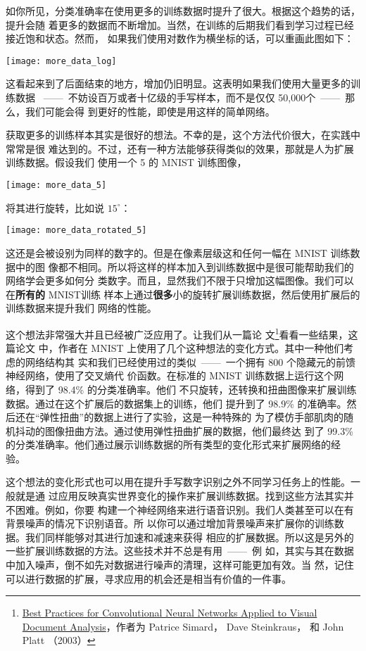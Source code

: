 如你所见，分类准确率在使用更多的训练数据时提升了很大。根据这个趋势的话，提升会随
着更多的数据而不断增加。当然，在训练的后期我们看到学习过程已经接近饱和状态。然而，
如果我们使用对数作为横坐标的话，可以重画此图如下：
\begin{center}
\texttt{[image: more\_data\_log]}
\end{center}

这看起来到了后面结束的地方，增加仍旧明显。这表明如果我们使用大量更多的训练数据
~——~不妨设百万或者十亿级的手写样本，而不是仅仅 50,000个~——~那么，我们可能会得
到更好的性能，即使是用这样的简单网络。

获取更多的训练样本其实是很好的想法。不幸的是，这个方法代价很大，在实践中常常是很
难达到的。不过，还有一种方法能够获得类似的效果，那就是人为扩展训练数据。假设我们
使用一个 5 的 MNIST 训练图像，
\begin{center}
  \texttt{[image: more\_data\_5]}
\end{center}
将其进行旋转，比如说 $15^{\circ}$：
\begin{center}
  \texttt{[image: more\_data\_rotated\_5]}
\end{center}

这还是会被设别为同样的数字的。但是在像素层级这和任何一幅在 MNIST 训练数据中的图
像都不相同。所以将这样的样本加入到训练数据中是很可能帮助我们的网络学会更多如何分
类数字。而且，显然我们不限于只增加这幅图像。我们可以在\textbf{所有的} MNIST训练
样本上通过\textbf{很多}小的旋转扩展训练数据，然后使用扩展后的训练数据来提升我们
网络的性能。

这个想法非常强大并且已经被广泛应用了。让我们从一篇论
文\footnote{\href{http://dx.doi.org/10.1109/ICDAR.2003.1227801}{Best Practices
    for Convolutional Neural Networks Applied to Visual Document Analysis}，作者为
  Patrice Simard， Dave Steinkraus， 和 John Platt （2003）}看看一些结果，这篇论文
中，作者在 MNIST 上使用了几个这种想法的变化方式。其中一种他们考虑的网络结构其
实和我们已经使用过的类似~——~一个拥有 800 个隐藏元的前馈神经网络，使用了交叉熵代
价函数。在标准的 MNIST 训练数据上运行这个网络，得到了 98.4\% 的分类准确率。他们
不只旋转，还转换和扭曲图像来扩展训练数据。通过在这个扩展后的数据集上的训练，他们
提升到了 98.9\% 的准确率。然后还在“弹性扭曲”的数据上进行了实验，这是一种特殊的
为了模仿手部肌肉的随机抖动的图像扭曲方法。通过使用弹性扭曲扩展的数据，他们最终达
到了 99.3\% 的分类准确率。他们通过展示训练数据的所有类型的变化形式来扩展网络的经
验。

这个想法的变化形式也可以用在提升手写数字识别之外不同学习任务上的性能。一般就是通
过应用反映真实世界变化的操作来扩展训练数据。找到这些方法其实并不困难。例如，你要
构建一个神经网络来进行语音识别。我们人类甚至可以在有背景噪声的情况下识别语音。所
以你可以通过增加背景噪声来扩展你的训练数据。我们同样能够对其进行加速和减速来获得
相应的扩展数据。所以这是另外的一些扩展训练数据的方法。这些技术并不总是有用~——~例
如，其实与其在数据中加入噪声，倒不如先对数据进行噪声的清理，这样可能更加有效。当
然，记住可以进行数据的扩展，寻求应用的机会还是相当有价值的一件事。

